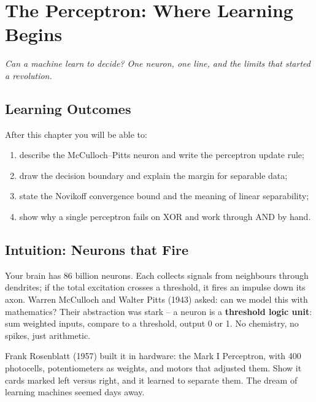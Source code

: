 \chapter{The Perceptron: Where Learning Begins}\label{ch:perceptron}
\begin{center}\small\textit{Can a machine learn to decide? One neuron, one line, and the limits that started a revolution.}\end{center}

\noindent{}
\vspace{0.3em}
\section*{Learning Outcomes}
After this chapter you will be able to:
\begin{enumerate}[label=(L\arabic*)]
    \item describe the McCulloch--Pitts neuron and write the perceptron update rule;
    \item draw the decision boundary and explain the margin for separable data;
    \item state the Novikoff convergence bound and the meaning of linear separability;
    \item show why a single perceptron fails on XOR and work through AND by hand.
\end{enumerate}

\section{Intuition: Neurons that Fire}
Your brain has 86 billion neurons. Each collects signals from neighbours through dendrites; if the total excitation crosses a threshold, it fires an impulse down its axon. Warren McCulloch and Walter Pitts (1943) asked: can we model this with mathematics? Their abstraction was stark -- a neuron is a \textbf{threshold logic unit}: sum weighted inputs, compare to a threshold, output 0 or 1. No chemistry, no spikes, just arithmetic.

Frank Rosenblatt (1957) built it in hardware: the Mark I Perceptron, with 400 photocells, potentiometers as weights, and motors that adjusted them. Show it cards marked left versus right, and it learned to separate them. The dream of learning machines seemed days away.

